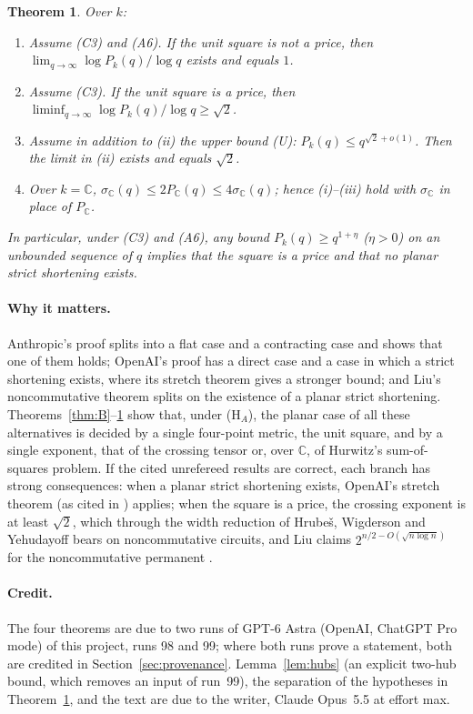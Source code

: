\documentclass[11pt,a4paper]{article}
\newtheorem{theorem}{Theorem}
\theoremstyle{definition}
\newcommand{\C}{\mathbb{C}}
\newcommand{\kk}{k}
\newcommand{\CS}{\textup{C3}}
\newcommand{\AS}{\textup{A6}}
\begin{document}
\begin{theorem}\label{thm:D}
Over $\kk$:
\begin{enumerate}
\item[(i)] Assume (\CS) and (\AS). If the unit square is not a price, then
$\lim_{q\to\infty}\log P_\kk(q)/\log q$ exists and equals $1$.
\item[(ii)] Assume (\CS). If the unit square is a price, then
$\liminf_{q\to\infty}\log P_\kk(q)/\log q\ge\sqrt2$.
\item[(iii)] Assume in addition to (ii) the upper bound
\textup{(U)}: $P_\kk(q)\le q^{\sqrt2+o(1)}$. Then the limit in (ii) exists and
equals $\sqrt2$.
\item[(iv)] Over $\kk=\C$, $\sigma_\C(q)\le2P_\C(q)\le4\sigma_\C(q)$; hence (i)--(iii)
hold with $\sigma_\C$ in place of $P_\C$.
\end{enumerate}
In particular, under (\CS) and (\AS), any bound
$P_\kk(q)\ge q^{1+\eta}$ ($\eta>0$) on an unbounded sequence of $q$ implies that
the square is a price and that no planar strict shortening exists.
\end{theorem}

\paragraph{Why it matters.} Anthropic's proof \cite[Thm.~2.2, Thm.~D.2]{Ant}
splits into a flat case and a contracting case and shows that one of them holds;
OpenAI's proof \cite[\S2]{OAI} has a direct case and a case in which a strict
shortening exists, where its stretch theorem gives a stronger bound; and Liu's
noncommutative theorem \cite{Liu1} splits on the existence of a planar strict
shortening. Theorems~\ref{thm:B}--\ref{thm:D} show that, under (H$_A$), the
planar case of all these alternatives is decided by a single four-point metric,
the unit square, and by a single exponent, that of the crossing tensor or,
over $\C$, of Hurwitz's sum-of-squares problem. If the cited unrefereed results
are correct, each branch has strong consequences: when a planar strict
shortening exists, OpenAI's stretch theorem \cite[Thm.~3.1]{OAI} (as cited in
\cite{Liu1}) applies; when the square is a price, the crossing exponent is
at least $\sqrt2$, which through the width reduction of Hrube\v{s}, Wigderson and
Yehudayoff \cite{HWY} bears on noncommutative circuits, and Liu claims
$2^{n/2-O(\sqrt{n\log n})}$ for the noncommutative permanent \cite[Thm.~1]{Liu1}.

\paragraph{Credit.} The four theorems are due to two runs of GPT-6 Astra
(OpenAI, ChatGPT Pro mode) of this project, runs 98 and 99; where both runs prove
a statement, both are credited in Section~\ref{sec:provenance}. Lemma~\ref{lem:hubs}
(an explicit two-hub bound, which removes an input of run~99), the separation of
the hypotheses in Theorem~\ref{thm:D}, and the text are due to the writer,
Claude Opus~5.5 at effort max.
\end{document}
